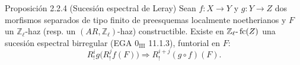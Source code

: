 \begin{statement}{Proposición 2.2.4 (Sucesión espectral de Leray)}
Sean \(f:X\to Y\) y \(g:Y\to Z\) dos morfismos separados de tipo finito de preesquemas localmente noetherianos y \(F\) un \(\mathbb Z_\ell\)-haz (resp. un \((AR,\mathbb Z_\ell)\)-haz) constructible. Existe en \(\mathbb Z_\ell\text{-}\operatorname{fc}(Z)\) una sucesión espectral birregular (EGA \(0_{\mathrm{III}}\) 11.1.3), funtorial en \(F\):
\[
R^i_!g\bigl(R^j_!f(F)\bigr)\Longrightarrow R^{i+j}_!(g\circ f)(F).
\]
\end{statement}

